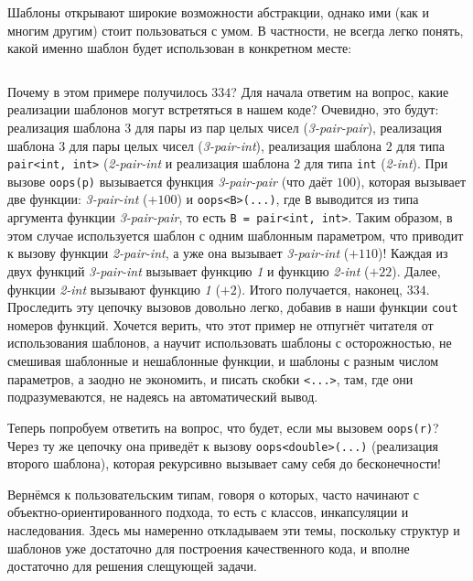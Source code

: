 \documentclass{book}
\begin{document}
Шаблоны открывают широкие возможности абстракции, однако ими (как и многим другим) стоит
пользоваться с умом. В частности, не всегда легко понять, какой именно шаблон будет использован в
конкретном месте:
\inputminted{cpp}{oops_templates.cpp}
Почему в этом примере получилось $334$? Для начала ответим на вопрос, какие реализации шаблонов
могут встретяться в нашем коде? Очевидно, это будут: реализация шаблона $3$ для пары из пар целых
чисел (\textit{3-pair-pair}), реализация шаблона $3$ для пары целых чисел (\textit{3-pair-int}),
реализация шаблона $2$ для типа \texttt{pair<int, int>} (\textit{2-pair-int} и реализация
шаблона $2$ для типа \texttt{int} (\textit{2-int}). При вызове \texttt{oops(p)}
вызывается функция \textit{3-pair-pair} (что даёт $100$), которая вызывает две функции:
\textit{3-pair-int} ($+100$) и \texttt{oops<B>(...)}, где \texttt{B} выводится из
типа аргумента функции \textit{3-pair-pair}, то есть \texttt{B = pair<int, int>}. Таким
образом, в этом случае используется шаблон с одним шаблонным параметром, что приводит к вызову
функции \textit{2-pair-int}, а уже она вызывает \textit{3-pair-int} ($+110$)! Каждая из двух
функций \textit{3-pair-int} вызывает функцию \textit{1} и функцию \textit{2-int} ($+22$). Далее,
функции \textit{2-int} вызывают функцию \textit{1} ($+2$). Итого получается, наконец, $334$.
Проследить эту цепочку вызовов довольно легко, добавив в наши функции \texttt{cout}
номеров функций.  Хочется верить, что этот пример не отпугнёт читателя от использования шаблонов, а
научит использовать шаблоны с осторожностью, не смешивая шаблонные и нешаблонные функции, и шаблоны
с разным числом параметров, а заодно не экономить, и писать скобки \texttt{<...>}, там,
где они подразумеваются, не надеясь на автоматический вывод.

Теперь попробуем ответить на вопрос, что будет, если мы вызовем \texttt{oops(r)}? Через ту
же цепочку она приведёт к вызову \texttt{oops<double>(...)} (реализация второго шаблона),
которая рекурсивно вызывает саму себя до бесконечности!

Вернёмся к пользовательским типам, говоря о которых, часто начинают с объектно-ориентированного
подхода, то есть с классов, инкапсуляции и наследования. Здесь мы намеренно откладываем эти темы,
поскольку структур и шаблонов уже достаточно для построения качественного кода, и вполне достаточно
для решения слещующей задачи.
\end{document}
